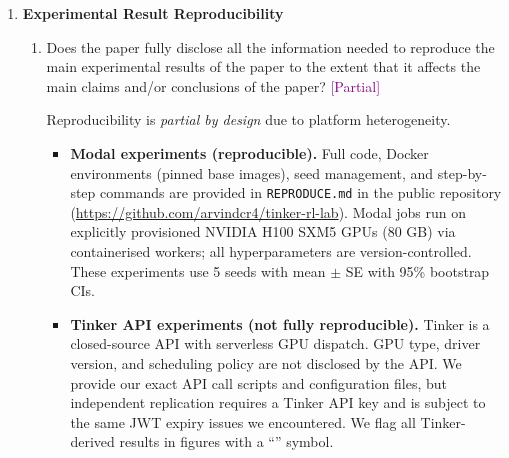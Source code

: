 \documentclass{article}
\newcommand{\answerPartial}[1][]{\textcolor{purple}{[Partial] #1}}
\begin{document}
\begin{enumerate}
\item {\bf Experimental Result Reproducibility}
    \begin{enumerate}
        \item Does the paper fully disclose all the information needed to
              reproduce the main experimental results of the paper to the
              extent that it affects the main claims and/or conclusions of
              the paper?
        \answerPartial{Reproducibility is \emph{partial by design} due to
        platform heterogeneity.
        \begin{itemize}
          \item \textbf{Modal experiments (reproducible).}  Full code,
                Docker environments (pinned base images), seed management,
                and step-by-step commands are provided in
                \texttt{REPRODUCE.md} in the public repository
                (\url{https://github.com/arvindcr4/tinker-rl-lab}).
                Modal jobs run on explicitly provisioned NVIDIA H100 SXM5
                GPUs (80 GB) via containerised workers; all hyperparameters
                are version-controlled.  These experiments use 5 seeds with
                mean $\pm$ SE with 95\% bootstrap CIs.
          \item \textbf{Tinker API experiments (not fully reproducible).}
                Tinker is a closed-source API with serverless GPU dispatch.
                GPU type, driver version, and scheduling policy are not
                disclosed by the API.  We provide our exact API call scripts and
                configuration files, but independent replication requires a
                Tinker API key and is subject to the same JWT expiry
                issues we encountered.  We flag all Tinker-derived results
                in figures with a ``\dag{}'' symbol.
        \end{itemize}}
    \end{enumerate}


\end{enumerate}
\end{document}
